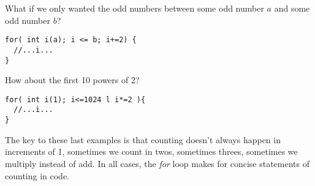 \documentclass[]{tufte-handout}
\begin{document}
What if we only wanted the odd numbers between some odd number $a$ and some odd number $b$?
\begin{verbatim}
for( int i(a); i <= b; i+=2) {
  //...i...
}
\end{verbatim}
How about the first 10 powers of 2?

\begin{verbatim}
for( int i(1); i<=1024 l i*=2 ){
  //...i...
}
\end{verbatim}

The key to these last examples is that counting doesn't always happen in increments of 1, sometimes we count in twos, sometimes threes, sometimes we multiply instead of add.  In all cases, the \textit{for} loop makes for concise statements of counting in code.
\end{document}
